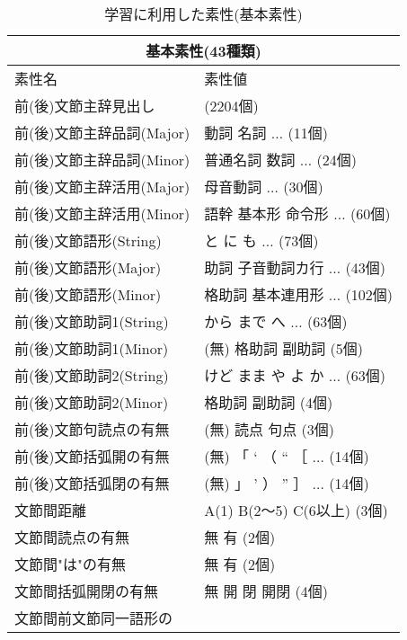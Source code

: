 \begin{table}[phtb]
  \begin{center}
    \caption{学習に利用した素性(基本素性)}
    \label{table:feature1}
    \renewcommand{\arraystretch}{}
    \leavevmode
    \begin{tabular}[c]{|l|l|}
      \hline
      \multicolumn{2}{|c|}{\bf 基本素性(43種類)}\\
      \hline
      素性名 & 素性値\\
      \hline
      \hline
      前(後)文節主辞見出し & (2204個) \\
      \hline
      前(後)文節主辞品詞(Major) & 動詞 名詞 $\ldots$ (11個) \\
      前(後)文節主辞品詞(Minor) & 普通名詞 数詞 $\ldots$ (24個) \\
      \hline
      前(後)文節主辞活用(Major) & 母音動詞 $\ldots$ (30個) \\
      前(後)文節主辞活用(Minor) & 語幹 基本形 命令形 $\ldots$ (60個) \\
      \hline
      前(後)文節語形(String) & と に も $\ldots$ (73個) \\
      前(後)文節語形(Major) & 助詞 子音動詞カ行 $\ldots$ (43個)\\
      前(後)文節語形(Minor) & 格助詞 基本連用形 $\ldots$ (102個)\\
      \hline
      前(後)文節助詞1(String) & から まで へ $\ldots$ (63個)\\
      前(後)文節助詞1(Minor) & (無) 格助詞 副助詞 (5個)\\
      \hline
      前(後)文節助詞2(String) & けど まま や よ か $\ldots$ (63個) \\
      前(後)文節助詞2(Minor) & 格助詞 副助詞 (4個) \\
      \hline
      前(後)文節句読点の有無 & (無) 読点 句点 (3個) \\
      \hline
      前(後)文節括弧開の有無 & (無) 「 ‘ （ “ ［ $\ldots$ (14個) \\
      \hline
      前(後)文節括弧閉の有無 & (無) 」 ’ ） ” ］ $\ldots$ (14個) \\
      \hline
      文節間距離 & A(1) B(2〜5) C(6以上) (3個) \\
      \hline
      文節間読点の有無 & 無 有 (2個) \\
      \hline
      文節間"は"の有無 & 無 有 (2個) \\
      \hline
      文節間括弧開閉の有無 & 無 開 閉 開閉 (4個) \\
      \hline
      文節間前文節同一語形の & \\

\end{tabular}
\end{center}
\end{table}
